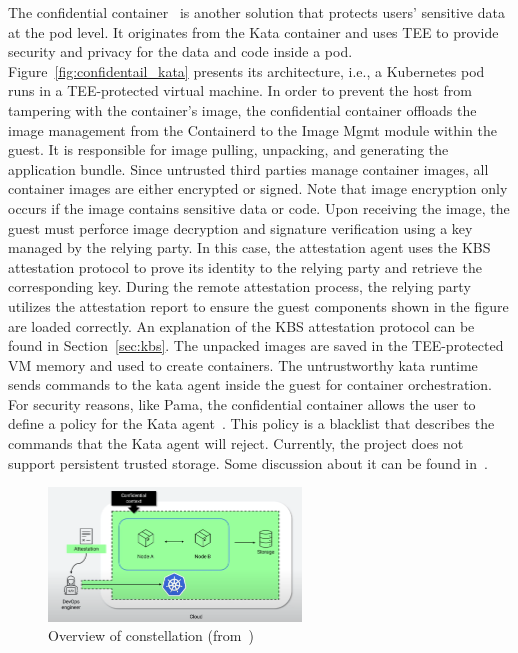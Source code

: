 The confidential container~\cite*{confidential_kata} is another solution that protects users' sensitive data at the pod level. It originates from the Kata container and uses TEE to provide security and privacy for the data and code inside a pod. Figure~\ref{fig:confidentail_kata} presents its architecture, i.e., a Kubernetes pod runs in a 
TEE-protected virtual machine. In order to prevent the host from tampering with the container's image, the confidential container offloads the image management from the Containerd to the Image Mgmt module within the guest. It is responsible for image pulling, unpacking, and generating the 
application bundle. Since untrusted third parties manage container images, all container images are either encrypted or signed. Note that image encryption only occurs if the image contains sensitive data or code. Upon receiving the image, the guest must perforce image decryption and signature 
verification using a key managed by the relying party. In this case, the attestation agent uses the KBS attestation protocol to prove its identity to the relying party and retrieve the corresponding key. During the remote attestation process, the relying party utilizes the attestation report to ensure the guest components 
shown in the figure are loaded correctly. An explanation of the KBS attestation protocol can be found in Section~\ref{sec:kbs}. The unpacked images are saved in the TEE-protected VM memory and used to create containers. The untrustworthy kata runtime sends commands to the kata agent inside the guest for container 
orchestration. For security reasons, like Pama, the confidential container allows the user to define a policy for the Kata agent~\cite*{kata_api_restriction}. This policy is a blacklist that describes the commands that the Kata agent will reject. Currently, the project does not support persistent trusted storage. 
Some discussion about it can be found in~\cite*{confidentail_kata_storage}.

\begin{figure}[htp]
    \centering
    \includegraphics[width=0.6\textwidth]{images/constellation_arch.png}
    \caption[Overview of constellation]{Overview of constellation (from~\cite*{Constellation_Always_encrypted})}
    \label{fig:constellation_arch}
\end{figure}

